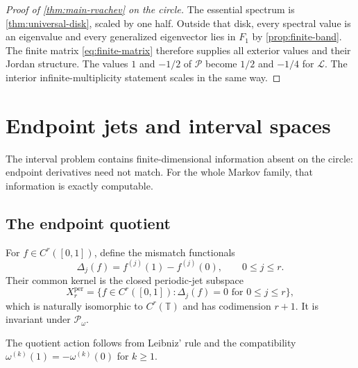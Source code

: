 \documentclass[11pt,a4paper]{article}
\theoremstyle{definition}
\theoremstyle{remark}
\newcommand{\T}{\mathbb T}
\newcommand{\Lop}{\mathcal L}
\newcommand{\Pop}{\mathcal P}
\begin{document}
\begin{proof}[Proof of \cref{thm:main-rvachev} on the circle]
The essential spectrum is \cref{thm:universal-disk}, scaled by one half.
Outside that disk, every spectral value is an eigenvalue and every generalized
eigenvector lies in $F_1$ by \cref{prop:finite-band}.  The finite matrix
\eqref{eq:finite-matrix} therefore supplies all exterior values and their
Jordan structure.  The values $1$ and $-1/2$ of $\Pop$ become $1/2$ and
$-1/4$ for $\Lop$.  The interior infinite-multiplicity statement scales in
the same way.
\end{proof}

\section{Endpoint jets and interval spaces}
\label{sec:endpoint-jets}

The interval problem contains finite-dimensional information absent on the
circle: endpoint derivatives need not match.  For the whole Markov family,
that information is exactly computable.

\subsection{The endpoint quotient}
For $f\in C^r([0,1])$, define the mismatch functionals
\begin{equation}
 \Delta_j(f)=f^{(j)}(1)-f^{(j)}(0),
 \qquad 0\le j\le r.
 \label{eq:jet-mismatch}
\end{equation}
Their common kernel is the closed periodic-jet subspace
\begin{equation}
 X_r^{\mathrm{per}}=
 \{f\in C^r([0,1]):\Delta_j(f)=0\text{ for }0\le j\le r\},
 \label{eq:periodic-subspace}
\end{equation}
which is naturally isomorphic to $C^r(\T)$ and has codimension $r+1$.
It is invariant under $\Pop_\omega$.

The quotient action follows from Leibniz' rule and the compatibility
$\omega^{(k)}(1)=-\omega^{(k)}(0)$ for $k\ge1$.
\end{document}
